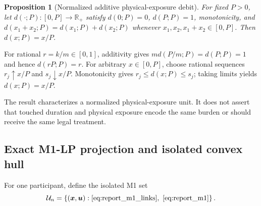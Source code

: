 \documentclass[10pt,journal,onecolumn]{IEEEtran}
\newtheorem{proposition}{Proposition}[section]
\newcommand{\R}{\mathbb{R}}
\begin{document}
\begin{proposition}[Normalized additive physical-exposure debit]
\label{prop:unique_m2}
For fixed $P>0$, let $d(\cdot;P):[0,P]\to\R_+$ satisfy
$d(0;P)=0$, $d(P;P)=1$, monotonicity, and
$d(x_1+x_2;P)=d(x_1;P)+d(x_2;P)$ whenever
$x_1,x_2,x_1+x_2\in[0,P]$. Then $d(x;P)=x/P$.
\end{proposition}

\begin{IEEEproof}
For rational $r=k/m\in[0,1]$, additivity gives
$m d(P/m;P)=d(P;P)=1$ and hence $d(rP;P)=r$. For arbitrary
$x\in[0,P]$, choose rational sequences $r_j\uparrow x/P$ and
$s_j\downarrow x/P$. Monotonicity gives
$r_j\leq d(x;P)\leq s_j$; taking limits yields $d(x;P)=x/P$.
\end{IEEEproof}

The result characterizes a normalized physical-exposure unit. It does not
assert that touched duration and physical exposure encode the same burden or
should receive the same legal treatment.

\subsection{Exact M1-LP projection and isolated convex hull}

For one participant, define the isolated M1 set
\begin{equation}
\mathcal U_n
=\left\{(\bm x,\bm u):
\eqref{eq:report_m1_links},\ \eqref{eq:report_m1}\right\}.
\end{equation}
\end{document}
